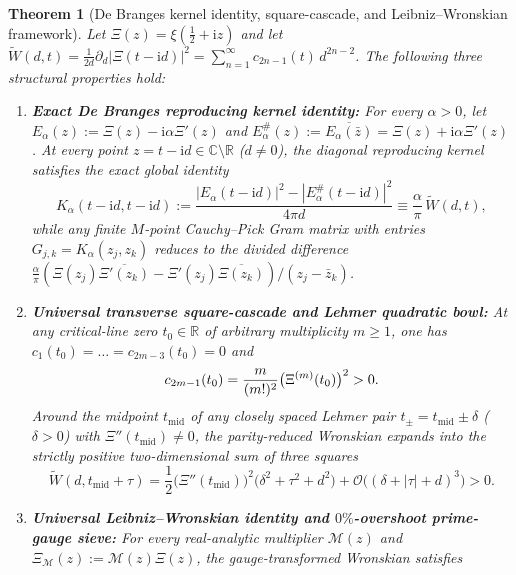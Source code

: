 \documentclass[11pt,reqno,a4paper]{amsart}
\theoremstyle{plain}
\newtheorem{theorem}{Theorem}[section]
\theoremstyle{definition}
\theoremstyle{remark}
\numberwithin{equation}{section}
\newcommand{\fac}{\mathclose{\mathchar"0021}}
\newcommand{\ii}{\mathrm{i}}
\begin{document}
\begin{theorem}[De Branges kernel identity, square-cascade, and Leibniz--Wronskian framework]\label{thm:main_summary}
Let $\Xi(z) = \xi(\frac{1}{2}+\ii z)$ and let $\widetilde{W}(d,t) = \frac{1}{2d}\partial_d|\Xi(t-\ii d)|^2 = \sum_{n=1}^\infty c_{2n-1}(t)\,d^{2n-2}$. The following three structural properties hold:
\begin{enumerate}[label=\textup{(\arabic*)},leftmargin=2.2em]
  \item \textbf{Exact De Branges reproducing kernel identity:} For every $\alpha > 0$, let $E_\alpha(z) := \Xi(z) - \ii\alpha\Xi'(z)$ and $E_\alpha^\#(z) := \overline{E_\alpha(\bar{z})} = \Xi(z) + \ii\alpha\Xi'(z)$. At every point $z = t - \ii d \in \mathbb{C}\setminus\mathbb{R}$ ($d \neq 0$), the diagonal reproducing kernel satisfies the exact global identity
  \begin{equation}\label{eq:intro_debranges}
    K_\alpha(t-\ii d, t-\ii d) := \frac{|E_\alpha(t-\ii d)|^2 - |E_\alpha^\#(t-\ii d)|^2}{4\pi d} \equiv \frac{\alpha}{\pi}\,\widetilde{W}(d,t),
  \end{equation}
  while any finite $M$-point Cauchy--Pick Gram matrix with entries $G_{j,k} = K_\alpha(z_j,z_k)$ reduces to the divided difference $\frac{\alpha}{\pi}(\Xi(z_j)\overline{\Xi'(z_k)} - \Xi'(z_j)\overline{\Xi(z_k)})/(z_j - \bar{z}_k)$.
  \item \textbf{Universal transverse square-cascade and Lehmer quadratic bowl:} At any critical-line zero $t_0 \in \mathbb{R}$ of arbitrary multiplicity $m \ge 1$, one has $c_1(t_0) = \dots = c_{2m-3}(t_0) = 0$ and
  \begin{equation}\label{eq:intro_cascade}
    c_{2m-1}(t_0) = \frac{m}{(m\fac)^2}\big(\Xi^{(m)}(t_0)\big)^2 > 0.
  \end{equation}
  Around the midpoint $t_{\mathrm{mid}}$ of any closely spaced Lehmer pair $t_\pm = t_{\mathrm{mid}} \pm \delta$ ($\delta > 0$) with $\Xi''(t_{\mathrm{mid}}) \neq 0$, the parity-reduced Wronskian expands into the strictly positive two-dimensional sum of three squares
  \begin{equation}\label{eq:intro_bowl}
    \widetilde{W}(d, t_{\mathrm{mid}} + \tau) = \frac{1}{2}\big(\Xi''(t_{\mathrm{mid}})\big)^2\big(\delta^2 + \tau^2 + d^2\big) + \mathcal{O}\big((\delta + |\tau| + d)^3\big) > 0.
  \end{equation}
  \item \textbf{Universal Leibniz--Wronskian identity and $0\%$-overshoot prime-gauge sieve:} For every real-analytic multiplier $\mathcal{M}(z)$ and $\Xi_{\mathcal{M}}(z) := \mathcal{M}(z)\Xi(z)$, the gauge-transformed Wronskian satisfies

\end{enumerate}
\end{theorem}
\end{document}
